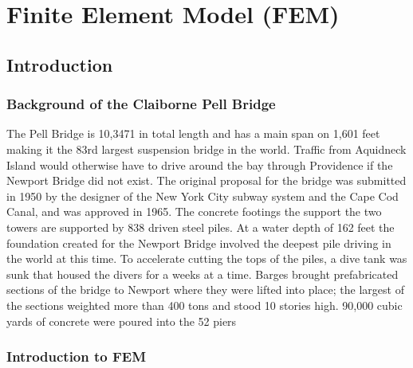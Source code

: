 \chapter{Finite Element Model (FEM)}

\section{Introduction}

\label{sec:examples}

\subsection{Background of the Claiborne Pell Bridge}

 The Pell Bridge is 10,3471 in total length and has a main span on 1,601 feet making it the 83rd largest suspension bridge in the world. Traffic from Aquidneck Island would otherwise have to drive around the bay through Providence if the Newport Bridge did not exist. The original proposal for the bridge was submitted in 1950 by the designer of the New York City subway system and the Cape Cod Canal, and was approved in 1965. The concrete footings the support the two towers are supported by 838 driven steel piles. At a water depth of 162 feet the foundation created for the Newport Bridge involved the deepest pile driving in the world at this time. To accelerate cutting the tops of the piles, a dive tank was sunk that housed the divers for a weeks at a time. Barges brought prefabricated sections of the bridge to Newport where they were lifted into place; the largest of the sections weighted more than 400 tons and stood 10 stories high. 90,000 cubic yards of concrete were poured into the 52 piers \cite{RIBTA}\\ 

\subsection{Introduction to FEM}

